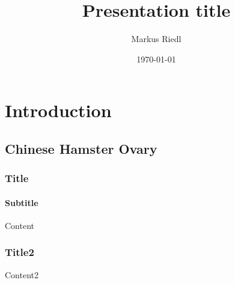 \documentclass[aspectratio=169]{beamer}
\title{Presentation title}
\author{Markus Riedl}
\date{\today} %
\institute{University of Natural Resources and Life Sciences, Vienna}
\begin{document}
\begin{frame}[plain]
\titlepage
\end{frame}

\section{Introduction}

\subsection{Chinese Hamster Ovary}

\begin{frame}
    \frametitle{Title}
    \framesubtitle{Subtitle}

    Content
\end{frame}

\begin{frame}
    \frametitle{Title2}

    Content2
\end{frame}
\end{document}
